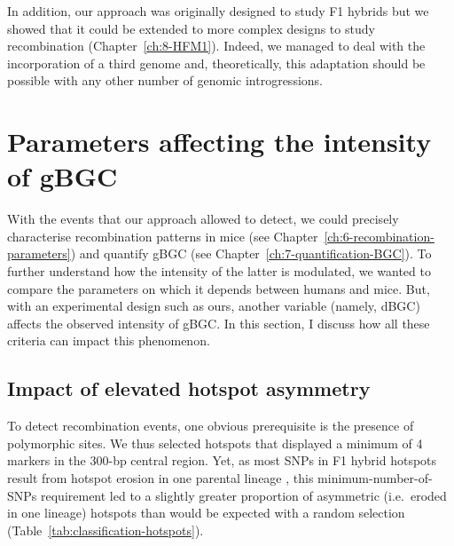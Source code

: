 
In addition, our approach was originally designed to study F1 hybrids but we showed that it could be extended to more complex designs to study recombination (Chapter~\ref{ch:8-HFM1}).
Indeed, we managed to deal with the incorporation of a third genome and, theoretically, this adaptation should be possible with any other number of genomic introgressions.





\section{Parameters affecting the intensity of gBGC}
\label{chap9:parameters-BGC}

With the events that our approach allowed to detect, we could precisely characterise recombination patterns in mice (see Chapter~\ref{ch:6-recombination-parameters}) and quantify gBGC (see Chapter~\ref{ch:7-quantification-BGC}).
To further understand how the intensity of the latter is modulated, we wanted to compare the parameters on which it depends between humans and mice.
But, with an experimental design such as ours, another variable (namely, dBGC) affects the observed intensity of gBGC\@.
In this section, I discuss how all these criteria can impact this phenomenon.


\subsection{Impact of elevated hotspot asymmetry}

To detect recombination events, one obvious prerequisite is the presence of polymorphic sites.
We thus selected hotspots that displayed a minimum of 4 markers in the 300-bp central region.
Yet, as most SNPs in F1 hybrid hotspots result from hotspot erosion in one parental lineage \citep{smagulova2016evolutionary}, this minimum-number-of-SNPs requirement led to a slightly greater proportion of asymmetric (i.e.\ eroded in one lineage) hotspots than would be expected with a random selection (Table~\ref{tab:classification-hotspots}).

